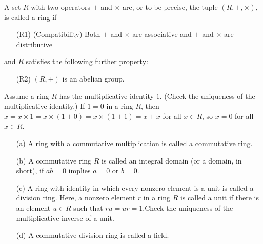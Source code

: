 \begin{defi}[Ring]
    A set $R$ with two operators $+$ and $\times$ are, or to be precise, the tuple $(R, +, 
    \times)$, is called a ring if
    \begin{enumerate}
        \item[(R1)]
        {
            (Compatibility)
            Both $+$ and $\times$ are associative and $+$ and $\times$ are distributive
        }
    \end{enumerate}
    and $R$ satisfies the following further property:
    \begin{enumerate}
        \item[(R2)]
        {
            $(R, +)$ is an abelian group.
        }
    \end{enumerate}
\end{defi}
\begin{rmk}
    Assume a ring $R$ has the multiplicative identity $1$. \color{brown}(Check the uniqueness of the multiplicative identity.) \color{black}
    If $1=0$ in a ring $R$, then $x=x\times 1=x\times(1+0)=x\times(1+1)=x+x$ for all $x\in R$, so $x=0$ for all $x\in R$.
\end{rmk}
\begin{defi}
    \begin{enumerate}
        \item[(a)]
        {
            A ring with a commutative multiplication is called a commutative ring.
        }
        \item[(b)]
        {
            A commutative ring $R$ is called an integral domain (or a domain, in short), if $ab=0$ implies $a=0$ or $b=0$.
        }
        \item[(c)]
        {
            A ring with identity in which every nonzero element is a unit is called a division ring.
            Here, a nonzero element $r$ in a ring $R$ is called a unit if there is an element $u\in R$ such that $ru=ur=1$.\color{brown}Check the uniqueness of the multiplicative inverse of a unit.\color{black}
        }
        \item[(d)]
        {
            A commutative division ring is called a field.
        }
    \end{enumerate}
\end{defi}

